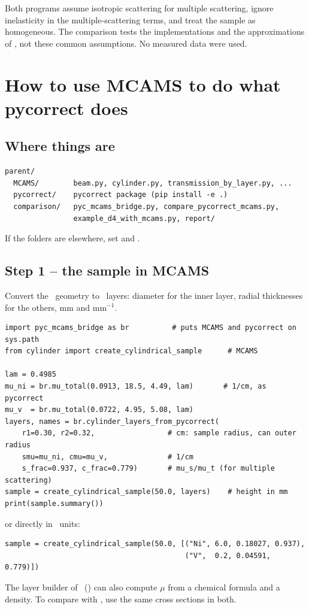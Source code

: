 \documentclass[11pt,a4paper]{report}
\begin{document}
\begin{warn}
Both programs assume isotropic scattering for multiple scattering, ignore
inelasticity in the multiple-scattering terms, and treat the sample as
homogeneous. The comparison tests the implementations and the approximations of
\cor, not these common assumptions. No measured data were used.
\end{warn}

\chapter{How to use MCAMS to do what pycorrect does}
\label{chap:howto}

\section{Where things are}

\begin{lstlisting}[style=shell]
parent/
  MCAMS/        beam.py, cylinder.py, transmission_by_layer.py, ...
  pycorrect/    pycorrect package (pip install -e .)
  comparison/   pyc_mcams_bridge.py, compare_pycorrect_mcams.py,
                example_d4_with_mcams.py, report/
\end{lstlisting}
If the folders are elsewhere, set  and .

\section{Step 1 -- the sample in MCAMS}

Convert the \pyc\ geometry to \mcams\ layers: diameter for the inner layer, radial
thicknesses for the others, mm and mm$^{-1}$.

\begin{lstlisting}
import pyc_mcams_bridge as br          # puts MCAMS and pycorrect on sys.path
from cylinder import create_cylindrical_sample      # MCAMS

lam = 0.4985
mu_ni = br.mu_total(0.0913, 18.5, 4.49, lam)       # 1/cm, as pycorrect
mu_v  = br.mu_total(0.0722, 4.95, 5.08, lam)
layers, names = br.cylinder_layers_from_pycorrect(
    r1=0.30, r2=0.32,                 # cm: sample radius, can outer radius
    smu=mu_ni, cmu=mu_v,              # 1/cm
    s_frac=0.937, c_frac=0.779)       # mu_s/mu_t (for multiple scattering)
sample = create_cylindrical_sample(50.0, layers)    # height in mm
print(sample.summary())
\end{lstlisting}
or directly in \mcams\ units:
\begin{lstlisting}
sample = create_cylindrical_sample(50.0, [("Ni", 6.0, 0.18027, 0.937),
                                          ("V",  0.2, 0.04591, 0.779)])
\end{lstlisting}
The layer builder of \mcams\ () can also compute $\mu$
from a chemical formula and a density. To compare with \pyc, use the same cross
sections in both.
\end{document}
